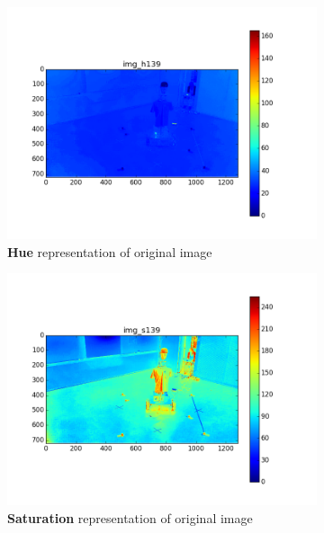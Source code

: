 \begin{figure}[H]
\begin{subfigure}[b]{0.49\linewidth}
		\includegraphics[width=\linewidth]{files/_img_h139.png}
		\caption{\textbf{Hue} representation of original image}
		\label{fig:img_h}
	\end{subfigure}
	\begin{subfigure}[b]{0.49\linewidth}
        \centering
		\includegraphics[width=\linewidth]{files/_img_s139.png}
		\caption{\textbf{Saturation} representation of original image}
		\label{fig:img_s}
	\end{subfigure}
	\begin{subfigure}[b]{0.49\linewidth}
        \centering

\end{subfigure}
\end{figure}
